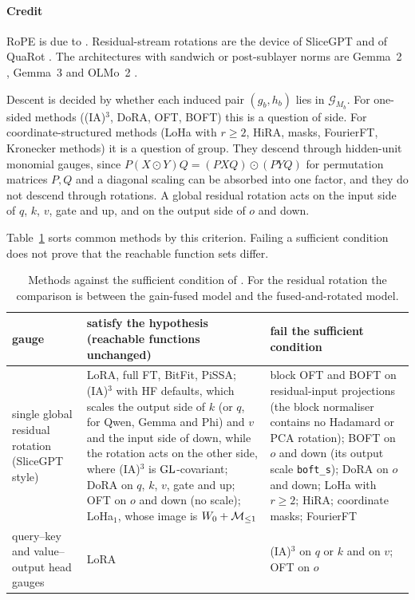 \paragraph{Credit}
RoPE is due to \citet{xsu2024roformer}. Residual-stream rotations are the device of SliceGPT \citep{xashkboos2024slicegpt}
and of QuaRot \citep{xashkboos2024quarot}. The architectures with sandwich or post-sublayer norms are Gemma~2
\citep{xgemma2024gemma2}, Gemma~3 \citep{xgemma2025gemma3} and OLMo~2 \citep{xolmo2024furious}.

\begin{explains}
Descent is decided by whether each induced pair $(g_b,h_b)$ lies in $\mathcal G_{M_b}$. For one-sided methods
((IA)$^3$, DoRA, OFT, BOFT) this is a question of side. For coordinate-structured methods (LoHa with $r\ge2$, HiRA, masks,
FourierFT, Kronecker methods) it is a question of group. They descend through hidden-unit monomial gauges, since
$P(X\odot Y)Q=(PXQ)\odot(PYQ)$ for permutation matrices $P,Q$ and a diagonal scaling can be absorbed into one factor, and
they do not descend through rotations. A global residual rotation acts on the input side of $q$, $k$, $v$, gate and up,
and on the output side of $o$ and down.
\end{explains}

Table~\ref{tab:descent} sorts common methods by this criterion. Failing a sufficient condition does not prove that the
reachable function sets differ.

\begin{table}[t]
  \centering
  \footnotesize
  \caption{Methods against the sufficient condition of . For the residual rotation the
    comparison is between the gain-fused model and the fused-and-rotated model.}
  \label{tab:descent}
  \renewcommand{\arraystretch}{1.15}
  \begin{tabularx}{\linewidth}{@{}>{\raggedright\arraybackslash}p{2.6cm}>{\raggedright\arraybackslash}X>{\raggedright\arraybackslash}X@{}}
    \toprule
    \headrow \textbf{gauge} & \textbf{satisfy the hypothesis (reachable functions unchanged)} & \textbf{fail the
      sufficient condition}\\
    \midrule
    single global residual rotation (SliceGPT style) & LoRA, full FT, BitFit, PiSSA; (IA)$^3$ with HF defaults, which
      scales the output side of $k$ (or $q$, for Qwen, Gemma and Phi) and $v$ and the input side of down, while the
      rotation acts on the other side, where (IA)$^3$ is $\mathrm{GL}$-covariant; DoRA on $q$, $k$, $v$, gate and up; OFT on $o$
      and down (no scale); LoHa$_1$, whose image is $W_0+\mathcal{M}_{\le1}$ & block OFT and BOFT on residual-input projections
      (the block normaliser contains no Hadamard or PCA rotation); BOFT on $o$ and down (its output scale
      \texttt{boft\_s}); DoRA on $o$ and down; LoHa with $r\ge2$; HiRA; coordinate masks; FourierFT\\
    query--key and value--output head gauges & LoRA & (IA)$^3$ on $q$ or $k$ and on $v$; OFT on $o$\\
    \bottomrule
  \end{tabularx}
\end{table}


